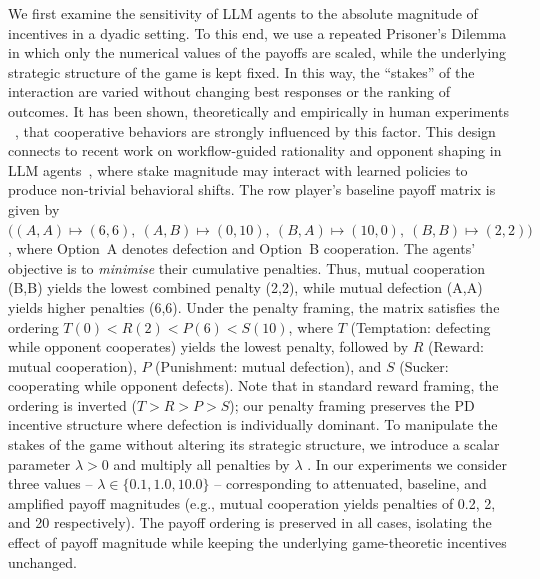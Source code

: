 \documentclass{article}
\begin{document}
We first examine the sensitivity of LLM agents to the absolute magnitude of incentives in a dyadic setting. To this end, we use a repeated Prisoner's Dilemma in which only the numerical values of the payoffs are scaled, while the underlying strategic structure of the game is kept fixed. In this way, the ``stakes'' of the interaction are varied without changing best responses or the ranking of outcomes. It has been shown, theoretically \cite{han_when_2021} and empirically in human experiments ~\cite{krockow2016cooperation,list2006friend}, that  cooperative behaviors are strongly influenced by this factor. This design connects to recent work on workflow-guided rationality and opponent shaping in LLM agents~\cite{hua2024gametheoretic}, where stake magnitude may interact with learned policies to produce non-trivial behavioral shifts.
The row player's baseline payoff matrix is given by 
$\bigl((A,A)\!\mapsto\!(6,6),\ (A,B)\!\mapsto\!(0,10),\ (B,A)\!\mapsto\!(10,0),\ (B,B)\!\mapsto\!(2,2)\bigr)$,
where Option~A denotes defection and Option~B cooperation. The agents' objective is to \emph{minimise} their cumulative penalties. Thus, mutual cooperation (B,B) yields the lowest combined penalty (2,2), while mutual defection (A,A) yields higher penalties (6,6). Under the penalty framing, the matrix satisfies the ordering $T(0) < R(2) < P(6) < S(10)$, where $T$ (Temptation: defecting while opponent cooperates) yields the lowest penalty, followed by $R$ (Reward: mutual cooperation), $P$ (Punishment: mutual defection), and $S$ (Sucker: cooperating while opponent defects). Note that in standard reward framing, the ordering is inverted ($T > R > P > S$); our penalty framing preserves the PD incentive structure where defection is individually dominant. To manipulate the stakes of the game without altering its strategic structure, we introduce a scalar parameter $\lambda > 0$ and multiply all penalties by $\lambda$ \cite{han_when_2021}. In our experiments we consider three values -- $\lambda \in \{0.1, 1.0, 10.0\}$ --
corresponding to attenuated, baseline, and amplified payoff magnitudes (e.g., mutual cooperation yields penalties of 0.2, 2, and 20 respectively). The payoff ordering is preserved in all cases, isolating the effect of payoff magnitude while keeping the underlying game-theoretic incentives unchanged.
\end{document}
